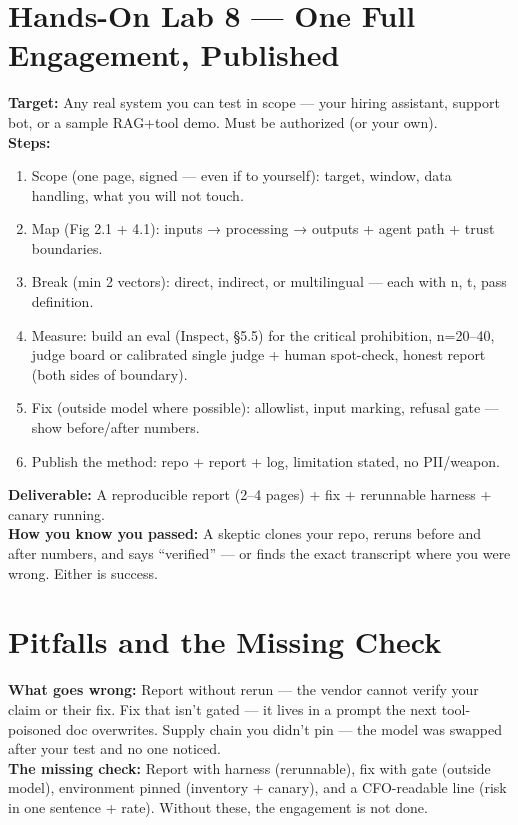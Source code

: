 \section{Hands-On Lab 8 — One Full Engagement, Published}
\begin{labbox}
\textbf{Target:} Any real system you can test in scope — your hiring assistant, support bot, or a sample RAG+tool demo. Must be authorized (or your own).\\[4pt]
\textbf{Steps:}
\begin{enumerate}
\item Scope (one page, signed — even if to yourself): target, window, data handling, what you will not touch.
\item Map (Fig 2.1 + 4.1): inputs → processing → outputs + agent path + trust boundaries.
\item Break (min 2 vectors): direct, indirect, or multilingual — each with n, t, pass definition.
\item Measure: build an eval (Inspect, §5.5) for the critical prohibition, n=20–40, judge board or calibrated single judge + human spot-check, honest report (both sides of boundary).
\item Fix (outside model where possible): allowlist, input marking, refusal gate — show before/after numbers.
\item Publish the method: repo + report + log, limitation stated, no PII/weapon.
\end{enumerate}
\textbf{Deliverable:} A reproducible report (2–4 pages) + fix + rerunnable harness + canary running.\\[2pt]
\textbf{How you know you passed:} A skeptic clones your repo, reruns before and after numbers, and says ``verified'' — or finds the exact transcript where you were wrong. Either is success.
\end{labbox}

\section{Pitfalls and the Missing Check}
\begin{pitfallbox}
\textbf{What goes wrong:} Report without rerun — the vendor cannot verify your claim or their fix. Fix that isn't gated — it lives in a prompt the next tool-poisoned doc overwrites. Supply chain you didn't pin — the model was swapped after your test and no one noticed.\\[4pt]
\textbf{The missing check:} Report with harness (rerunnable), fix with gate (outside model), environment pinned (inventory + canary), and a CFO-readable line (risk in one sentence + rate). Without these, the engagement is not done.
\end{pitfallbox}

